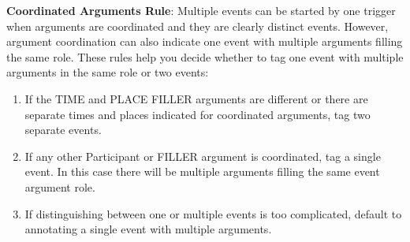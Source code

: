 \textbf{Coordinated Arguments Rule}:
Multiple events can be started by one trigger when arguments are coordinated and they are clearly distinct events.
However, argument coordination can also indicate one event with multiple arguments filling the same role.
These rules help you decide whether to tag one event with multiple arguments in the same role or two events:
\begin{enumerate}
    \item If the TIME and PLACE FILLER arguments are different or there are separate times and places indicated for coordinated arguments, tag two separate events.
    \item If any other Participant or FILLER argument is coordinated, tag a single event.
    In this case there will be multiple arguments filling the same event argument role.
    \item If distinguishing between one or multiple events is too complicated, default to annotating a single event with multiple arguments.
\end{enumerate}

